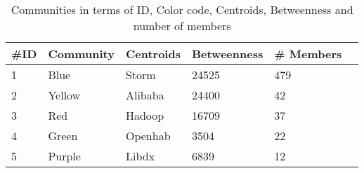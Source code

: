 
\begin{table}[]
\centering
\caption{Communities in terms of ID, Color code, Centroids, Betweenness and number of members}
\label{tab:communities}
\begin{tabular}{llllll}
\#ID               & Community             & Centroids        & Betweenness & \# Members        \\ \hline
1                  & Blue                  & Storm &           24525 &    479                                      \\ \hline
2                  & Yellow                & Alibaba          & 24400      & 42                                     \\ \hline 
3                  & Red                   & Hadoop           & 16709      & 37                                      \\ \hline
4                  & Green                 & Openhab          & 3504       & 22                                     \\  \hline
5                  & Purple                & Libdx              & 6839       & 12      \\  \hline  \hline                              
\end{tabular}
\end{table}

